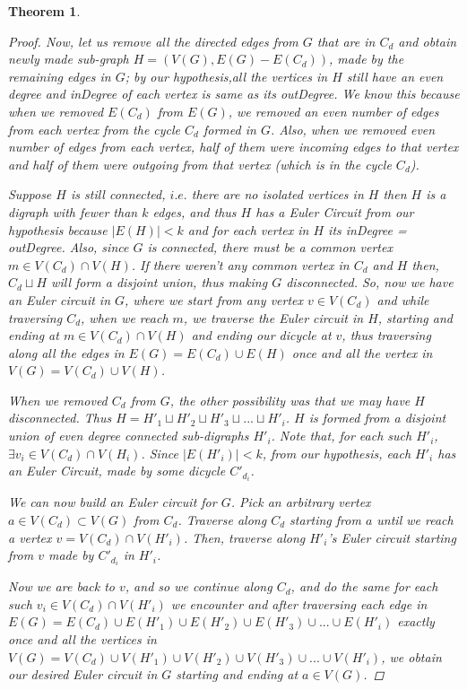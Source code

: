 \documentclass[17pt]{article}
\newtheorem{theorem}{Theorem}
\begin{document}
\begin{theorem}
\begin{proof}
 	 Now, let us remove all the directed edges from $G$ that are in $C_d$ and obtain newly made sub-graph $H = (V(G), E(G)-E(C_d))$, made by the remaining edges in $G$; by our hypothesis,all the vertices in $H$ still have an even degree and inDegree of each vertex is same as its outDegree. We know this because when we removed $E(C_d)$ from $E(G)$, we removed an even number of edges from each vertex from the cycle $C_d$ formed in $G$. Also, when we removed even number of edges from each vertex, half of them were incoming edges to that vertex and half of them were outgoing from that vertex (which is in the cycle $C_d$).
 	 
 	  Suppose $H$ is still connected, $i.e.$ there are no isolated vertices in $H$ then $H$ is a digraph with fewer than $k$ edges, and thus $H$ has a Euler Circuit from our hypothesis because $\vert E(H) \vert < k$ and for each vertex in $H$ its inDegree = outDegree. Also, since $G$ is connected, there must be a common vertex $m \in V(C_d) \cap V(H)$. If there weren't any common vertex in $C_d$ and $H$ then, $C_d \sqcup H$ will form a disjoint union, thus making $G$ disconnected. So, now we have an Euler circuit in $G$, where we start from any vertex $v \in V(C_d)$ and while traversing $C_d$, when we reach $m$, we traverse the Euler circuit in $H$, starting and ending at $m \in V(C_d) \cap V(H)$ and ending our dicycle at $v$, thus traversing along all the edges in $E(G) = E(C_d) \cup E(H)$ once and all the vertex in $V(G) = V(C_d) \cup V(H)$.
 	 
 	   When we removed $C_d$ from $G$, the other possibility was that we may have $H$ disconnected. Thus $H = H'_1 \sqcup H'_2 \sqcup H'_3 \sqcup ... \sqcup H'_i$. $H$ is formed from a disjoint union of even degree connected sub-digraphs $H'_i$. Note that, for each such $H'_i$, $\exists v_i \in V(C_d) \cap V(H_i)$. Since $\vert E(H'_i) \vert < k$, from our hypothesis, each $H'_i$ has an Euler Circuit, made by some dicycle $C'_{d_i}$.
 	   
 	   We can now build an Euler circuit for $G$. Pick an arbitrary vertex $a \in V(C_d) \subset V(G)$ from $C_d$. Traverse along $C_d$ starting from $a$ until we reach a vertex $v = V(C_d) \cap V(H'_i)$. Then, traverse along $H'_i$'s Euler circuit starting from $v$ made by  $C'_{d_i}$ in $H'_i$. 
 	   
 	   Now we are back to $v$, and so we continue along $C_d$, and do the same for each such $v_i \in V(C_d) \cap V(H'_i)$ we encounter and after traversing each edge in $E(G) = E(C_d) \cup E(H'_1)\cup E(H'_2) \cup E(H'_3)\cup... \cup E(H'_i)$ exactly once and all the vertices in $V(G) = V(C_d) \cup V(H'_1)\cup V(H'_2) \cup V(H'_3) \cup... \cup V(H'_i)$, we obtain our desired Euler circuit in $G$ starting and ending at $a \in V(G)$.

\end{proof}
\end{theorem}
\newpage
\end{document}
